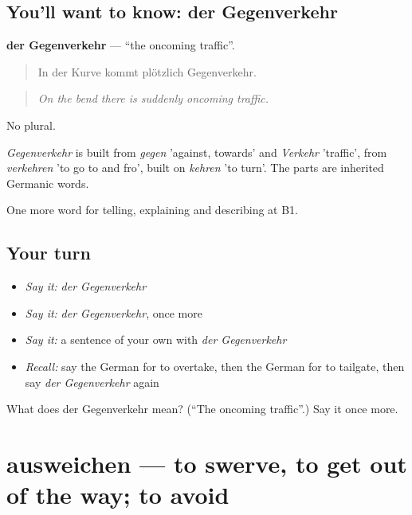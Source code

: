 \subsection*{You'll want to know: der Gegenverkehr}
\textbf{der Gegenverkehr} — \textquotedblleft{}the oncoming traffic\textquotedblright{}.

\begin{quote}
In der Kurve kommt plötzlich Gegenverkehr.
\end{quote}

\begin{quote}
\emph{On the bend there is suddenly oncoming traffic.}
\end{quote}

No plural.

\begin{cousinweb}
\emph{Gegenverkehr} is built from \emph{gegen} 'against, towards' and \emph{Verkehr} 'traffic', from \emph{verkehren} 'to go to and fro', built on \emph{kehren} 'to turn'. The parts are inherited Germanic words.
\end{cousinweb}

\begin{grammarlens}[title={What you've built}]
One more word for telling, explaining and describing at B1.
\end{grammarlens}

\subsection*{Your turn}
\begin{itemize}
\raggedright
  \item \emph{Say it:} \emph{der Gegenverkehr}
  \item \emph{Say it:} \emph{der Gegenverkehr}, once more
  \item \emph{Say it:} a sentence of your own with \emph{der Gegenverkehr}
  \item \emph{Recall:} say the German for to overtake, then the German for to tailgate, then say \emph{der Gegenverkehr} again
\end{itemize}

\begin{tcolorbox}[breakable,colback=teal!4,colframe=teal!35!black,title={Before you move on}]
What does der Gegenverkehr mean? (\textquotedblleft{}The oncoming traffic\textquotedblright{}.) Say it once more.
\end{tcolorbox}
\section[ausweichen]{ausweichen — to swerve, to get out of the way; to avoid}

